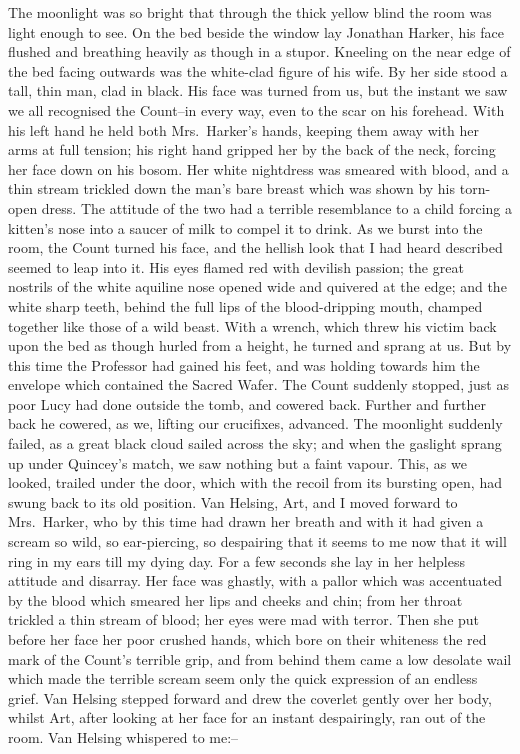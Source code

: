 \documentclass[12pt,openright]{book}
\begin{document}
The moonlight was so bright that through the thick yellow blind the room was light enough to see. On the bed beside the window lay Jonathan Harker, his face flushed and breathing heavily as though in a stupor. Kneeling on the near edge of the bed facing outwards was the white-clad figure of his wife. By her side stood a tall, thin man, clad in black. His face was turned from us, but the instant we saw we all recognised the Count–in every way, even to the scar on his forehead. With his left hand he held both Mrs. Harker’s hands, keeping them away with her arms at full tension; his right hand gripped her by the back of the neck, forcing her face down on his bosom. Her white nightdress was smeared with blood, and a thin stream trickled down the man’s bare breast which was shown by his torn-open dress. The attitude of the two had a terrible resemblance to a child forcing a kitten’s nose into a saucer of milk to compel it to drink. As we burst into the room, the Count turned his face, and the hellish look that I had heard described seemed to leap into it. His eyes flamed red with devilish passion; the great nostrils of the white aquiline nose opened wide and quivered at the edge; and the white sharp teeth, behind the full lips of the blood-dripping mouth, champed together like those of a wild beast. With a wrench, which threw his victim back upon the bed as though hurled from a height, he turned and sprang at us. But by this time the Professor had gained his feet, and was holding towards him the envelope which contained the Sacred Wafer. The Count suddenly stopped, just as poor Lucy had done outside the tomb, and cowered back. Further and further back he cowered, as we, lifting our crucifixes, advanced. The moonlight suddenly failed, as a great black cloud sailed across the sky; and when the gaslight sprang up under Quincey’s match, we saw nothing but a faint vapour. This, as we looked, trailed under the door, which with the recoil from its bursting open, had swung back to its old position. Van Helsing, Art, and I moved forward to Mrs. Harker, who by this time had drawn her breath and with it had given a scream so wild, so ear-piercing, so despairing that it seems to me now that it will ring in my ears till my dying day. For a few seconds she lay in her helpless attitude and disarray. Her face was ghastly, with a pallor which was accentuated by the blood which smeared her lips and cheeks and chin; from her throat trickled a thin stream of blood; her eyes were mad with terror. Then she put before her face her poor crushed hands, which bore on their whiteness the red mark of the Count’s terrible grip, and from behind them came a low desolate wail which made the terrible scream seem only the quick expression of an endless grief. Van Helsing stepped forward and drew the coverlet gently over her body, whilst Art, after looking at her face for an instant despairingly, ran out of the room. Van Helsing whispered to me:–
\end{document}
